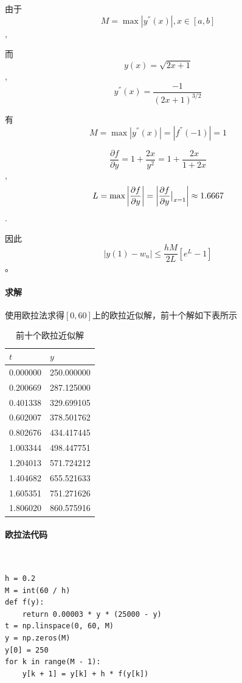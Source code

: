 由于$$M = \max \left|y^{''}\left(x\right) \right|,x\in \left[a,b\right]$$,

而$$y\left(x\right) = \sqrt{2x+1}$$,$$y^{''}\left(x\right) = \frac{-1}{\left(2x+1\right)^{3/2}}$$

有$$M = \max \left|y^{''}\left(x\right) \right| = \left|f^{''}\left(-1\right)\right| = 1$$

$$ \frac{\partial f}{\partial y} = 1+\frac{2x}{y^2} = 1+\frac{2x}{1+2x}$$, $$L = \max \left|\frac{\partial f}{\partial y} \right| = \left|\frac{\partial f}{\partial y} \big{|}_{x=1} \right| \approx 1.6667$$.

因此$$\left|y\left(1\right) - w_{n} \right| \leq \frac{hM}{2L}\left[ e^{L}-1\right] $$。

\paragraph{求解}使用欧拉法求得$[0,60]$上的欧拉近似解，前十个解如下表所示

\begin{table}[H]
	\centering
	\caption{前十个欧拉近似解}
	\begin{tabular}{ll}
		\hline
		$t$      & $y$        \\ \hline
		0.000000 & 250.000000 \\
		0.200669 & 287.125000 \\
		0.401338 & 329.699105 \\
		0.602007 & 378.501762 \\
		0.802676 & 434.417445 \\
		1.003344 & 498.447751 \\
		1.204013 & 571.724212 \\
		1.404682 & 655.521633 \\
		1.605351 & 751.271626 \\
		1.806020 & 860.575916 \\ \hline
	\end{tabular}
\end{table}

\paragraph{欧拉法代码}
~\\
\begin{verbatim}
h = 0.2
M = int(60 / h)
def f(y):
    return 0.00003 * y * (25000 - y)
t = np.linspace(0, 60, M)
y = np.zeros(M)
y[0] = 250
for k in range(M - 1):
    y[k + 1] = y[k] + h * f(y[k])
\end{verbatim}

